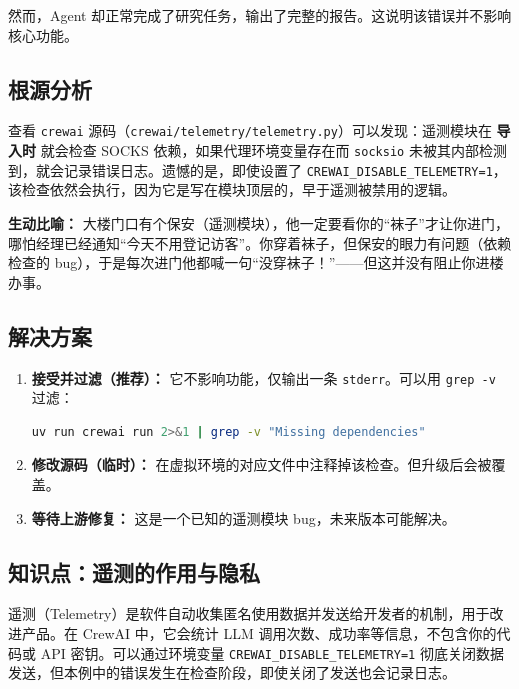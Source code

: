 \documentclass[12pt,a4paper]{ctexart}
\begin{document}
然而，Agent 却正常完成了研究任务，输出了完整的报告。这说明该错误并不影响核心功能。

\subsection{根源分析}
查看 \texttt{crewai} 源码（\texttt{crewai/telemetry/telemetry.py}）可以发现：遥测模块在 \textbf{导入时} 就会检查 SOCKS 依赖，如果代理环境变量存在而 \texttt{socksio} 未被其内部检测到，就会记录错误日志。遗憾的是，即使设置了 \texttt{CREWAI\_DISABLE\_TELEMETRY=1}，该检查依然会执行，因为它是写在模块顶层的，早于遥测被禁用的逻辑。

\textbf{生动比喻：} 大楼门口有个保安（遥测模块），他一定要看你的“袜子”才让你进门，哪怕经理已经通知“今天不用登记访客”。你穿着袜子，但保安的眼力有问题（依赖检查的 bug），于是每次进门他都喊一句“没穿袜子！”——但这并没有阻止你进楼办事。

\subsection{解决方案}
\begin{enumerate}[itemsep=0pt]
    \item \textbf{接受并过滤（推荐）：} 它不影响功能，仅输出一条 \texttt{stderr}。可以用 \texttt{grep -v} 过滤：
    \begin{lstlisting}[language=bash]
uv run crewai run 2>&1 | grep -v "Missing dependencies"
    \end{lstlisting}
    \item \textbf{修改源码（临时）：} 在虚拟环境的对应文件中注释掉该检查。但升级后会被覆盖。
    \item \textbf{等待上游修复：} 这是一个已知的遥测模块 bug，未来版本可能解决。
\end{enumerate}

\subsection{知识点：遥测的作用与隐私}
遥测（Telemetry）是软件自动收集匿名使用数据并发送给开发者的机制，用于改进产品。在 CrewAI 中，它会统计 LLM 调用次数、成功率等信息，不包含你的代码或 API 密钥。可以通过环境变量 \texttt{CREWAI\_DISABLE\_TELEMETRY=1} 彻底关闭数据发送，但本例中的错误发生在检查阶段，即使关闭了发送也会记录日志。
\end{document}
